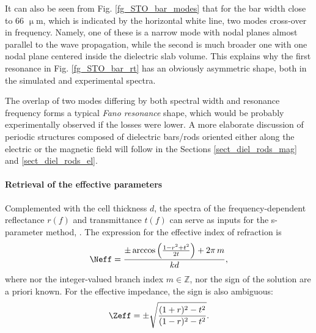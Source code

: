 It can also be seen from Fig. \ref{fg_STO_bar_modes} that for the bar width close to 66 $\upmu$m, which is indicated by the horizontal white line, two modes cross-over in frequency. Namely, one of these is a narrow mode with nodal planes almost parallel to the wave propagation, while the second is much broader one with one nodal plane centered inside the dielectric slab volume. This explains why the first resonance in Fig. \ref{fg_STO_bar_rt} has an obviously asymmetric shape, both in the simulated and experimental spectra. 

The overlap of two modes differing by both spectral width and resonance frequency forms a typical \textit{Fano resonance} shape, which would be probably experimentally observed if the losses were lower.
A more elaborate discussion of periodic structures composed of dielectric bars/rods oriented either along the electric or the magnetic field will follow in the Sections \ref{sect_diel_rods_mag} and \ref{sect_diel_rods_el}.
\paragraph{Retrieval of the effective parameters} %
Complemented with the cell thickness $d$, the spectra of the frequency-dependent reflectance $r(f)$ and transmittance $t(f)$ can serve as inputs for the s-parameter method,  \cite{smith2002determination, smith2005electromagnetic} \cite[pp. 51-55]{shalaev2010book}. The expression for the effective index of refraction is
\begin{equation} \Neff = \frac{\pm \arccos\left(\frac{1 - r^2+t^2}{2 t}\right) + 2\pi\,m}{k d}, \label{eq_Neff} \end{equation}
where nor the integer-valued branch index $m\in \mathbb{Z}$, nor the sign of the solution are a priori known. For the effective impedance, the sign is also ambiguous: 
\begin{equation} \Zeff = \pm \sqrt{\frac{(1+r)^2 - t^2}{(1-r)^2 - t^2}}. \label{eq_Zeff} \end{equation}

